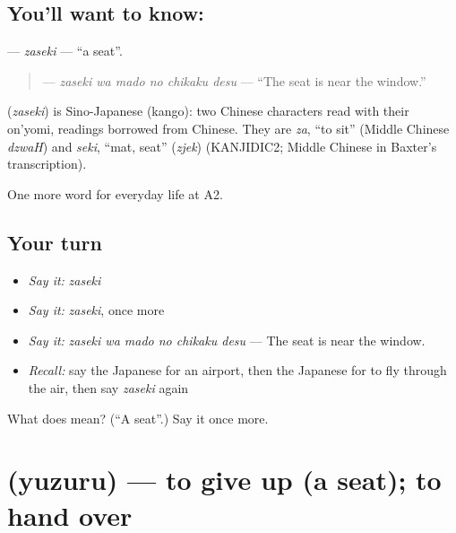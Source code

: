 \subsection*{You'll want to know: }
\textbf{} — \emph{zaseki} — \textquotedblleft{}a seat\textquotedblright{}.

\begin{quote}
\textbf{  } — \emph{zaseki wa mado no chikaku desu} — \textquotedblleft{}The seat is near the window.\textquotedblright{}
\end{quote}

\begin{cousinweb}
\textbf{} (\emph{zaseki}) is Sino-Japanese (kango): two Chinese characters read with their on'yomi, readings borrowed from Chinese. They are \emph{za}, \textquotedblleft{}to sit\textquotedblright{} (Middle Chinese \emph{dzwaH}) and \emph{seki}, \textquotedblleft{}mat, seat\textquotedblright{} (\emph{zjek}) (KANJIDIC2; Middle Chinese in Baxter's transcription).
\end{cousinweb}

\begin{grammarlens}[title={What you've built}]
One more word for everyday life at A2.
\end{grammarlens}

\subsection*{Your turn}
\begin{itemize}
\raggedright
  \item \emph{Say it:} \emph{zaseki}
  \item \emph{Say it:} \emph{zaseki}, once more
  \item \emph{Say it:} \emph{zaseki wa mado no chikaku desu} — The seat is near the window.
  \item \emph{Recall:} say the Japanese for an airport, then the Japanese for to fly through the air, then say \emph{zaseki} again
\end{itemize}

\begin{tcolorbox}[breakable,colback=teal!4,colframe=teal!35!black,title={Before you move on}]
What does  mean? (\textquotedblleft{}A seat\textquotedblright{}.) Say it once more.
\end{tcolorbox}
\section[\texorpdfstring{\ja{ゆずる} (yuzuru)}{ゆずる (yuzuru)}]{ (yuzuru) — to give up (a seat); to hand over}

